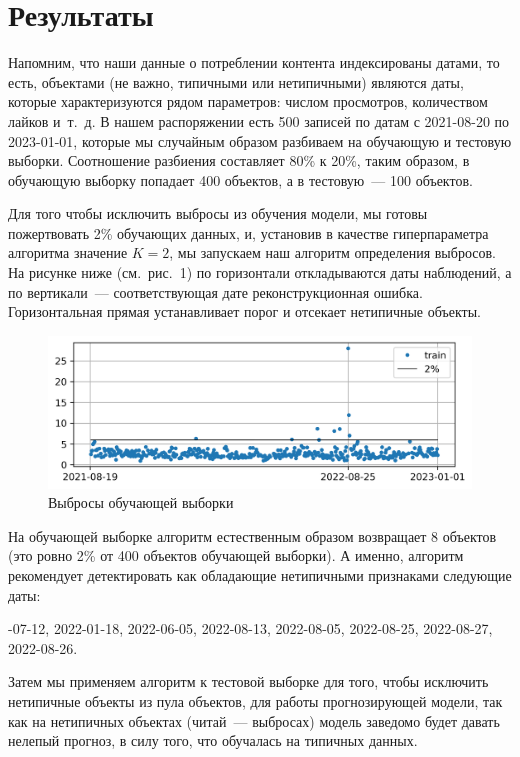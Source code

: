 \documentclass[a4paper,12pt]{article}
\begin{document}
\section{Результаты}

Напомним, что наши данные о потреблении контента индексированы датами, то есть, объектами (не важно, типичными или нетипичными) являются даты, которые характеризуются рядом параметров: числом просмотров, количеством лайков и т. д.
В нашем распоряжении есть 500 записей по датам с 2021-08-20 по 2023-01-01, которые мы случайным образом разбиваем на обучающую и тестовую выборки. Соотношение разбиения составляет 80\% к 20\%, таким образом, в обучающую выборку попадает 400 объектов, а в тестовую — 100 объектов.

Для того чтобы исключить выбросы из обучения модели, мы готовы пожертвовать 2\% обучающих данных, и, установив в качестве гиперпараметра алгоритма значение $K = 2$, мы запускаем наш алгоритм определения выбросов. На рисунке ниже (см. рис. 1) по горизонтали откладываются даты наблюдений, а по вертикали — соответствующая дате реконструкционная ошибка.  Горизонтальная прямая устанавливает порог и отсекает нетипичные объекты.
\begin{figure}[!h]
	\centering
	\includegraphics[width=0.9\linewidth]{pictures/train}
	\caption{Выбросы обучающей выборки}
\end{figure}

\noindent
На обучающей выборке алгоритм естественным образом возвращает 8 объектов (это ровно 2\% от 400 объектов обучающей выборки). А именно, алгоритм рекомендует детектировать как обладающие нетипичными признаками следующие даты:

\medskip
{}-07-12, 2022-01-18, 2022-06-05, 2022-08-13, 2022-08-05, 2022-08-25, 2022-08-27, 2022-08-26.

\medskip
\noindent
Затем мы применяем алгоритм к тестовой выборке для того, чтобы исключить нетипичные объекты из пула объектов, для работы прогнозирующей модели, так как на нетипичных объектах (читай — выбросах) модель заведомо будет давать нелепый прогноз, в силу того, что обучалась на типичных данных.
\end{document}
